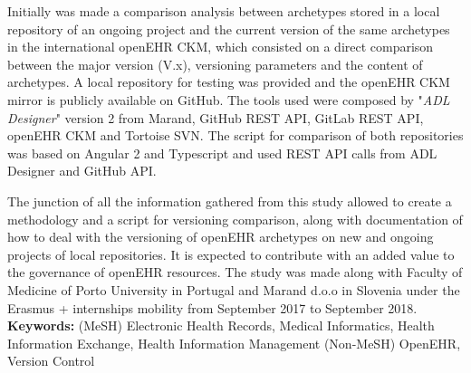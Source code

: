 \documentclass[mim_thesis.tex]{subfiles}
\begin{document}
Initially was made a comparison analysis between archetypes stored in a local repository of an ongoing project and the current version of the same archetypes in the international openEHR CKM, which consisted on a direct comparison between the major version (V.x), versioning parameters and the content of archetypes. A local repository for testing was provided and the openEHR CKM mirror is publicly available on GitHub. The tools used were composed by "\textit{ADL Designer}" version 2 from Marand, GitHub REST API, GitLab REST API, openEHR CKM and Tortoise SVN. The script for comparison of both repositories was based on Angular 2 and Typescript and used REST API calls from ADL Designer and GitHub API.

The junction of all the information gathered from this study allowed to 
create a methodology and a script for versioning comparison, along with documentation of how to deal with the versioning of openEHR archetypes on new and ongoing projects of local repositories. It is expected to contribute with an added value to the governance of openEHR resources. The study was made along with Faculty of Medicine of Porto University in Portugal and Marand d.o.o in Slovenia under the Erasmus + internships mobility from September 2017 to September 2018.\\

\textbf{Keywords:} (MeSH) Electronic Health Records, Medical Informatics, Health Information 
Exchange, Health Information Management (Non-MeSH) OpenEHR, Version Control 
\end{document}
